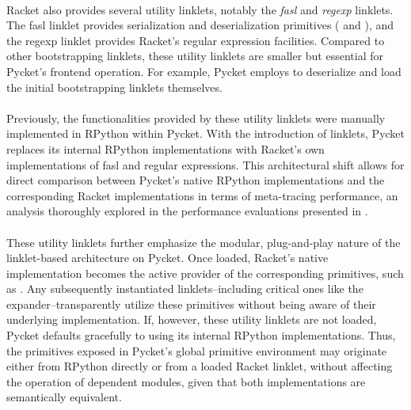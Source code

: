 			\paragraph{}%
				Racket also provides several utility linklets, notably the \emph{fasl} and \emph{regexp} linklets. The fasl linklet provides serialization and deserialization primitives ( and ), and the regexp linklet provides Racket's regular expression facilities. Compared to other bootstrapping linklets, these utility linklets are smaller but essential for Pycket’s frontend operation. For example, Pycket employs  to deserialize and load the initial bootstrapping linklets themselves.

			\paragraph{}%
				Previously, the functionalities provided by these utility linklets were manually implemented in RPython within Pycket. With the introduction of linklets, Pycket replaces its internal RPython implementations with Racket’s own implementations of fasl and regular expressions. This architectural shift allows for direct comparison between Pycket’s native RPython implementations and the corresponding Racket implementations in terms of meta-tracing performance, an analysis thoroughly explored in the performance evaluations presented in .

			\paragraph{}%
				These utility linklets further emphasize the modular, plug-and-play nature of the linklet-based architecture on Pycket. Once loaded, Racket’s native implementation becomes the active provider of the corresponding primitives, such as . Any subsequently instantiated linklets--including critical ones like the expander--transparently utilize these primitives without being aware of their underlying implementation. If, however, these utility linklets are not loaded, Pycket defaults gracefully to using its internal RPython implementations. Thus, the primitives exposed in Pycket's global primitive environment may originate either from RPython directly or from a loaded Racket linklet, without affecting the operation of dependent modules, given that both implementations are semantically equivalent.

